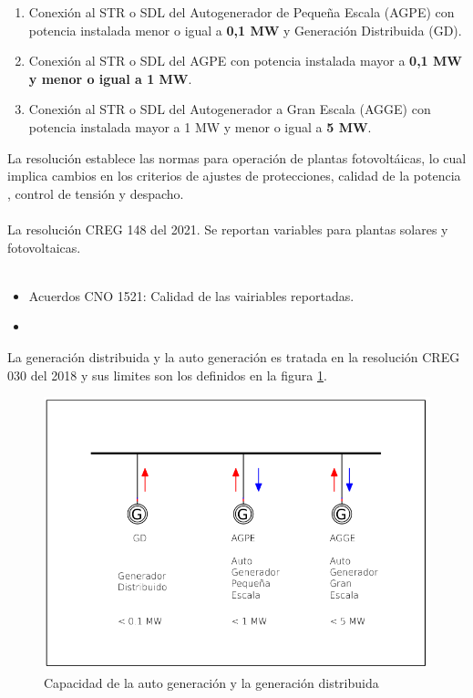 \documentclass[a5paper]{book}%
\begin{document}
\begin{enumerate}
	\item Conexión al STR o SDL del Autogenerador de Pequeña Escala (AGPE) con potencia 	instalada menor o igual a \textbf{0,1 MW} y Generación Distribuida (GD).
	\item  Conexión al STR o SDL del AGPE con potencia instalada mayor a \textbf{0,1 MW y menor o
	igual a 1 MW}.
	\item Conexión al STR o SDL del Autogenerador a Gran Escala (AGGE) con potencia instalada mayor a 1 MW y menor o igual a \textbf{5 MW}.
\end{enumerate}


La resolución \cite{CREG-060-2019} establece las normas para operación
de plantas fotovoltáicas, lo  cual implica cambios en los criterios de ajustes de protecciones, calidad de la potencia ,  control de tensión y despacho.\\\\

La resolución CREG 148 del 2021. Se reportan variables para plantas solares y fotovoltaicas.\\\\

\begin{itemize}
\item Acuerdos CNO 1521: Calidad de las vairiables reportadas.
\item
\end{itemize}

La generación distribuida  y la auto generación es tratada en la resolución CREG 030 del 2018 y sus limites son los definidos en la figura \ref{fig:gd}.

\begin{figure}[H]
	\centering
	\includegraphics[width=0.7\linewidth]{gd}
	\caption{Capacidad de la auto generación y la generación distribuida}
	\label{fig:gd}
      \end{figure}
      
\end{document}
